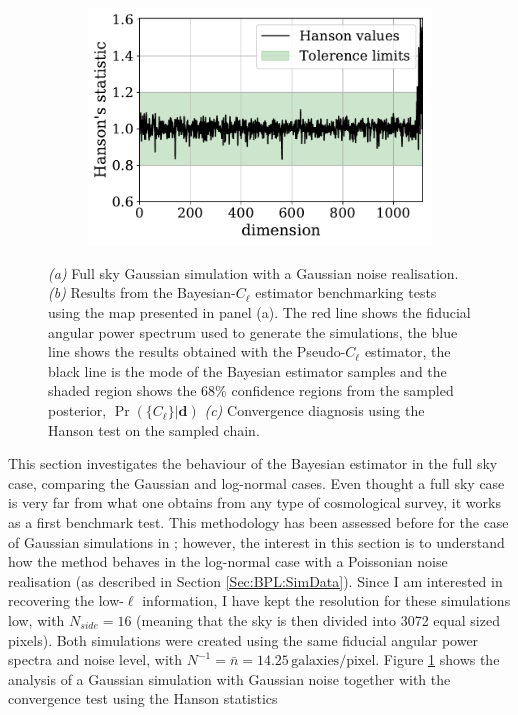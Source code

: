 \begin{figure}
\begin{subfigure}{.5\textwidth}
  \includegraphics[scale=0.50]{BPL-FIGS/GenData-FullSky-N16_Hanson.pdf}
  \caption{}
\end{subfigure}
\caption[Bayesian-$C_{\ell}$ estimator tested on a full sky Gaussian simulation.]{\textit{(a)} Full sky Gaussian simulation with a Gaussian noise realisation.  \textit{(b)} Results from the Bayesian-$C_{\ell}$ estimator benchmarking tests using the map presented in panel (a). The red line shows the fiducial angular power spectrum used to generate the simulations, the blue line shows the results obtained with the Pseudo-$C_{\ell}$ estimator, the black line is the mode of the Bayesian estimator samples and the shaded region shows the 68\% confidence regions from the sampled posterior, $\Pr (\{C_{\ell}\}|\mathbf{d})$ \textit{(c)} Convergence diagnosis using the Hanson test on the sampled chain.}%
\label{fig:BPL:GaussianFSAnalysis}
\end{figure}
This section investigates the behaviour of the Bayesian estimator in the full sky case, comparing the Gaussian and log-normal cases. Even thought a full sky case is very far from what one obtains from any type of cosmological survey, it works as a first benchmark test. This methodology has been assessed before for the case of Gaussian simulations in \cite{SreeThesis}; however, the interest in this section is to understand how the method behaves in the log-normal case with a Poissonian noise realisation (as described in Section \ref{Sec:BPL:SimData}). Since I am interested in recovering the low-$\ell$ information, I have kept the resolution for these simulations low, with $N_{side} = 16$ (meaning that the sky is then divided into 3072 equal sized pixels). Both simulations were created using the same fiducial angular power spectra and noise level, with $N^{-1} = \bar{n} = 14.25\,  \text{galaxies}/\text{pixel}$. Figure \ref{fig:BPL:GaussianFSAnalysis} shows the analysis of a Gaussian simulation with Gaussian noise together with the convergence test using the Hanson statistics %
